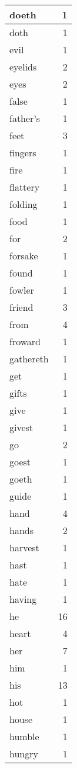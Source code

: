 \begin{center}
\begin{longtable}{l|r}
doeth & 1\\ \hline 
doth & 1\\ \hline 
evil & 1\\ \hline 
eyelids & 2\\ \hline 
eyes & 2\\ \hline 
false & 1\\ \hline 
father's & 1\\ \hline 
feet & 3\\ \hline 
fingers & 1\\ \hline 
fire & 1\\ \hline 
flattery & 1\\ \hline 
folding & 1\\ \hline 
food & 1\\ \hline 
for & 2\\ \hline 
forsake & 1\\ \hline 
found & 1\\ \hline 
fowler & 1\\ \hline 
friend & 3\\ \hline 
from & 4\\ \hline 
froward & 1\\ \hline 
gathereth & 1\\ \hline 
get & 1\\ \hline 
gifts & 1\\ \hline 
give & 1\\ \hline 
givest & 1\\ \hline 
go & 2\\ \hline 
goest & 1\\ \hline 
goeth & 1\\ \hline 
guide & 1\\ \hline 
hand & 4\\ \hline 
hands & 2\\ \hline 
harvest & 1\\ \hline 
hast & 1\\ \hline 
hate & 1\\ \hline 
having & 1\\ \hline 
he & 16\\ \hline 
heart & 4\\ \hline 
her & 7\\ \hline 
him & 1\\ \hline 
his & 13\\ \hline 
hot & 1\\ \hline 
house & 1\\ \hline 
humble & 1\\ \hline 
hungry & 1\\ \hline 

\end{longtable}
\end{center}
